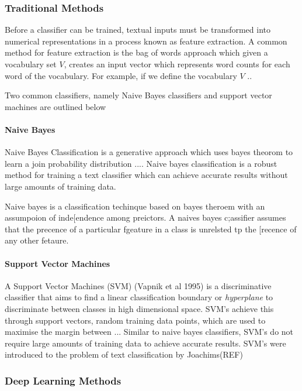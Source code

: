 \subsubsection{Traditional Methods}
Before a classifier can be trained, textual inputs must be transformed into numerical representations in a process known as feature extraction. A common method for feature extraction is the bag of words approach which given a vocabulary set \(V\), creates an input vector which represents word counts for each word of the vocabulary. For example, if we define the vocabulary \(V\) ..

\noindent
\newline
Two common classifiers, namely Naive Bayes classifiers and support vector machines are outlined below

\paragraph{Naive Bayes}
\noindent
\newline 
Naive Bayes Classification is a generative approach which uses bayes theorom to learn a join probability distribution .... Naive bayes classification is a robust method for training a text classifier which can achieve accurate results without large amounts of training data.

Naive bayes is a classification techinque based on bayes theroem with an assumpoion of inde[endence among preictors. A naives bayes c;assifier assumes that the precence of a particular fgeature in a class is unrelsted tp the [recence of any other fetaure.

\paragraph{Support Vector Machines}
\noindent
\newline 
A Support Vector Machines (SVM) (Vapnik et al 1995) is a discriminative classifier that aims to find a linear classification boundary or \textit{hyperplane} to discriminate between classes in high dimensional space. SVM's achieve this through support vectors, random training data points, which are used to maximise the margin between ... Similar to naive bayes classifiers, SVM's do not require large amounts of training data to achieve accurate results. SVM's were introduced to the problem of text classification by Joachims(REF)

\subsubsection{Deep Learning Methods}